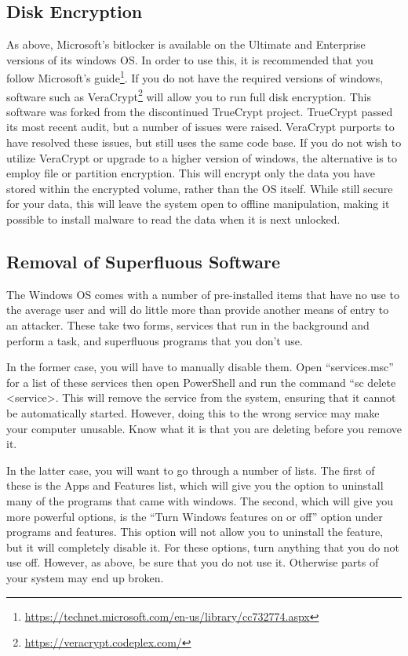 		\subsection{Disk Encryption}
			As above, Microsoft's bitlocker is available on the Ultimate and Enterprise versions of its windows OS.
			In order to use this, it is recommended that you follow Microsoft's guide\footnote{\url{https://technet.microsoft.com/en-us/library/cc732774.aspx}}.
			If you do not have the required versions of windows, software such as VeraCrypt\footnote{\url{https://veracrypt.codeplex.com/}} will allow you to run full disk encryption.
			This software was forked from the discontinued TrueCrypt project.
			TrueCrypt passed its most recent audit, but a number of issues were raised.
			VeraCrypt purports to have resolved these issues, but still uses the same code base.
			If you do not wish to utilize VeraCrypt or upgrade to a higher version of windows, the alternative is to employ file or partition encryption.
			This will encrypt only the data you have stored within the encrypted volume, rather than the OS itself.
			While still secure for your data, this will leave the system open to offline manipulation,
			making it possible to install malware to read the data when it is next unlocked.
		\subsection{Removal of Superfluous Software}
			The Windows OS comes with a number of pre-installed items that have no use to the average user and will do little more than provide another means of entry to an attacker.
			These take two forms, services that run in the background and perform a task, and superfluous programs that you don't use.

			In the former case, you will have to manually disable them.
			Open ``services.msc'' for a list of these services then open PowerShell and run the command ``sc delete <service>.
			This will remove the service from the system, ensuring that it cannot be automatically started.
			However, doing this to the wrong service may make your computer unusable.
			Know what it is that you are deleting before you remove it.

			In the latter case, you will want to go through a number of lists.
			The first of these is the Apps and Features list, which will give you the option to uninstall many of the programs that came with windows.
			The second, which will give you more powerful options, is the ``Turn Windows features on or off'' option under programs and features.
			This option will not allow you to uninstall the feature, but it will completely disable it.
			For these options, turn anything that you do not use off.
			However, as above, be sure that you do not use it.
			Otherwise parts of your system may end up broken.

